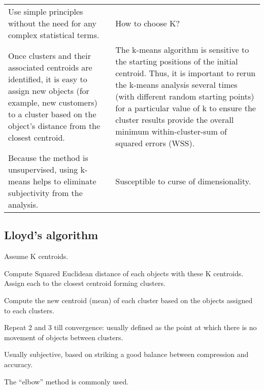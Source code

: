 	\begin{table}
		\begin{tabular}{|p{}|p{}|} \hline
			\tablecolumnheadervlinesone{Strengths} & \tablecolumnheadervlinestwo{Weakness} \\ \hline
			Use simple principles without the need for any complex statistical terms. &
			How to choose K? \\ \hline
			Once clusters and their associated centroids are identified, it is easy to assign new objects (for example, new customers) to a cluster based on the object's distance from the closest centroid. &
			The k-means algorithm is sensitive to the starting positions of the initial centroid. Thus, it is important to rerun the k-means analysis several times (with different random starting points) for a particular value of k to ensure the cluster results provide the overall minimum within-cluster-sum of squared errors (WSS). \\ \hline
			Because the method is unsupervised, using k-means helps to eliminate subjectivity from the analysis. &
			Susceptible to curse of dimensionality. \\ \hline
		\end{tabular}
	\end{table}

	\subsection{Lloyd's algorithm}

	\begin{numberedlist}
		\item Assume K centroids.
		\item Compute Squared Euclidean distance of each objects with these K centroids. Assign each to the closest centroid forming clusters.
		\item Compute the new centroid (mean) of each cluster based on the objects assigned to each clusters.
		\item Repeat 2 and 3 till convergence: usually defined as the point at which there is no movement of objects between clusters.
	\end{numberedlist}

	\begin{bulletedlist}
		\item Usually subjective, based on striking a good balance between compression and accuracy.
		\item The ``elbow'' method is commonly used.
	\end{bulletedlist}

